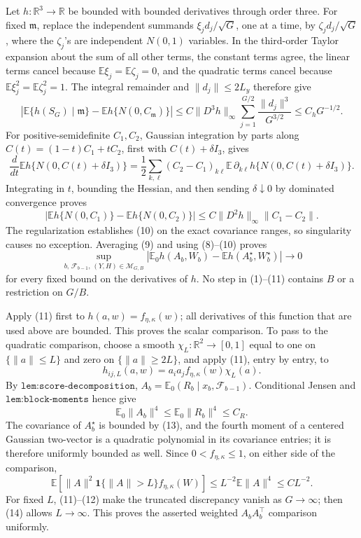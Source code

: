 Let \(h:\mathbb R^3\to\mathbb R\) be bounded with bounded derivatives through order three.  For fixed \(\mathfrak m\), replace the independent summands \(\xi_jd_j/\sqrt G\), one at a time, by \(\zeta_jd_j/\sqrt G\), where the \(\zeta_j\)'s are independent \(N(0,1)\) variables.  In the third-order Taylor expansion about the sum of all other terms, the constant terms agree, the linear terms cancel because \(\mathbb E\xi_j=\mathbb E\zeta_j=0\), and the quadratic terms cancel because \(\mathbb E\xi_j^2=\mathbb E\zeta_j^2=1\).  The integral remainder and \(\|d_j\|\leq2L_y\) therefore give
\[
 \left|\mathbb E\{h(S_G)\mid\mathfrak m\}
       -\mathbb Eh\{N(0,C_{\mathfrak m})\}\right|
 \leq C\|D^3h\|_\infty
       \sum_{j=1}^{G/2}\frac{\|d_j\|^3}{G^{3/2}}
 \leq C_hG^{-1/2}.                                        \tag{9}
\]
For positive-semidefinite \(C_1,C_2\), Gaussian integration by parts along \(C(t)=(1-t)C_1+tC_2\), first with \(C(t)+\delta I_3\), gives
\[
 \frac{d}{dt}\mathbb Eh\{N(0,C(t)+\delta I_3)\}
 =\frac12\sum_{k,\ell}(C_2-C_1)_{k\ell}
      \mathbb E\,\partial_{k\ell}h\{N(0,C(t)+\delta I_3)\}.
\]
Integrating in \(t\), bounding the Hessian, and then sending \(\delta\downarrow0\) by dominated convergence proves
\[
 |\mathbb Eh\{N(0,C_1)\}-\mathbb Eh\{N(0,C_2)\}|
 \leq C\|D^2h\|_\infty\|C_1-C_2\|.                     \tag{10}
\]
The regularization establishes (10) on the exact covariance ranges, so singularity causes no exception.  Averaging (9) and using (8)--(10) proves
\[
 \sup_{b,\,\mathcal F_{b-1},\,(Y,H)\in\mathcal M_{G,B}}
 \left|\mathbb E_0h(A_b,W_b)-\mathbb Eh(A_b^\star,W_b^\star)\right|
 \longrightarrow0                                         \tag{11}
\]
for every fixed bound on the derivatives of \(h\).  No step in (1)--(11) contains \(B\) or a restriction on \(G/B\).

Apply (11) first to \(h(a,w)=f_{\eta,\kappa}(w)\); all derivatives of this function that are used above are bounded.  This proves the scalar comparison.  To pass to the quadratic comparison, choose a smooth \(\chi_L:\mathbb R^2\to[0,1]\) equal to one on \(\{\|a\|\leq L\}\) and zero on \(\{\|a\|\geq2L\}\), and apply (11), entry by entry, to
\[
 h_{ij,L}(a,w)=a_ia_jf_{\eta,\kappa}(w)\chi_L(a).          \tag{12}
\]
By \(\texttt{lem:score-decomposition}\), \(A_b=\mathbb E_0(R_b\mid x_b,\mathcal F_{b-1})\).  Conditional Jensen and \(\texttt{lem:block-moments}\) hence give
\[
 \mathbb E_0\|A_b\|^4\leq\mathbb E_0\|R_b\|^4\leq C_R. \tag{13}
\]
The covariance of \(A_b^\star\) is bounded by (13), and the fourth moment of a centered Gaussian two-vector is a quadratic polynomial in its covariance entries; it is therefore uniformly bounded as well.  Since \(0<f_{\eta,\kappa}\leq1\), on either side of the comparison,
\[
 \mathbb E\!\left[\|A\|^2\mathbf1\{\|A\|>L\}
                  f_{\eta,\kappa}(W)\right]
 \leq L^{-2}\mathbb E\|A\|^4\leq C L^{-2}.              \tag{14}
\]
For fixed \(L\), (11)--(12) make the truncated discrepancy vanish as \(G\to\infty\); then (14) allows \(L\to\infty\).  This proves the asserted weighted \(A_bA_b^\top\) comparison uniformly.

